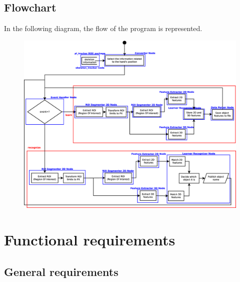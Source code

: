\subsection{Flowchart}
In the following diagram, the flow of the program is represented. 
\begin{figure}[H]
\begin{center}
\includegraphics[width=\textwidth]{img/diagrams/flowcharts.eps}
\end{center}
\end{figure}





\section{Functional requirements}

\subsection{General requirements}

